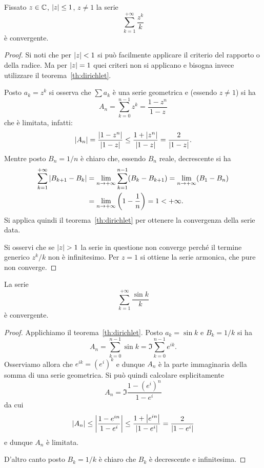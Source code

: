 \begin{exercise}
Fissato $z\in {\mathbb C}$, ${\left|z\right|} \le 1$, $z\neq 1$ la serie
\[
  \sum_{k=1}^{+\infty} \frac{z^k}{k}
\]
è convergente.
\end{exercise}
\begin{proof}
Si noti che per ${\left|z\right|}<1$ si può facilmente applicare
il criterio del rapporto o della radice.
Ma per ${\left|z\right|}=1$ quei criteri non si applicano e
bisogna invece utilizzare il teorema~\ref{th:dirichlet}.

Posto $a_k=z^k$ si osserva che $\sum a_k$ è una
serie geometrica e (essendo $z\neq 1$) si ha
\[
  A_n = \sum_{k=0}^{n-1} z^k = \frac{1-z^n}{1-z}
\]
che è limitata, infatti:
\[
  {\left|A_n\right|} = \frac{{\left|1-z^n\right|}}{{\left|1-z\right|}} \le \frac{1+{\left|z^n\right|}}{{\left|1-z\right|}}
  = \frac{2}{{\left|1-z\right|}}.
\]
Mentre posto $B_n = 1/n$ è chiaro che, essendo $B_n$ reale,
decrescente si ha
\begin{align*}
\sum_{k=1}^{+\infty} {\left|B_{k+1}-B_{k}\right|}
&= \lim_{n\to +\infty}\sum_{k=1}^{n-1} (B_k-B_{k+1})
= \lim_{n\to +\infty}(B_1 - B_n)\\
&= \lim_{n\to +\infty}{\left( 1 - \frac{1}{n} \right)} = 1
< +\infty.
\end{align*}
Si applica quindi il teorema~\ref{th:dirichlet}
per ottenere la convergenza
della serie data.

Si osservi che se ${\left|z\right|}>1$ la serie in questione non
converge perché il termine generico $z^k/k$ non è infinitesimo.
Per $z=1$ si ottiene la serie armonica, che pure non converge.
\end{proof}

\begin{exercise}
  La serie
  \[
    \sum_{k=1}^{+\infty} \frac{\sin k}{k}
  \]
  è convergente.
  \end{exercise}
  \begin{proof}
  Applichiamo il teorema~\ref{th:dirichlet}.
  Posto $a_k = \sin k$ e $B_k=1/k$
  si ha
  \[
    A_n = \sum_{k=0}^{n-1} \sin k = \Im \sum_{k=0}^{n-1} e^{ik}.
  \]
  Osserviamo allora che $e^{ik}=(e^i)^k$ e dunque $A_n$ è la parte immaginaria
  della somma di una serie geometrica. 
  Si può quindi calcolare esplicitamente
  \[
    A_n = \Im \frac{1-(e^i)^n}{1-e^i}
  \]
  da cui
  \[
    {\left|A_n\right|} \le {\left|\frac{1-e^{in}}{1-e^i}\right|} \le \frac{1+{\left|e^{in}\right|}}{{\left|1-e^i\right|}}
    = \frac{2}{{\left|1-e^i\right|}}
  \]
  e dunque $A_n$ è limitata.
  
  D'altro canto posto $B_k = 1/k$ è chiaro che $B_k$ è
  decrescente e infinitesima.
  \end{proof}
  
